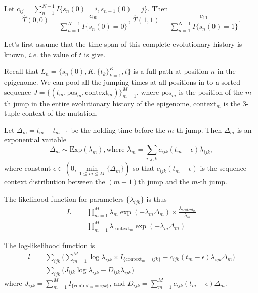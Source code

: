 \documentclass[11pt]{article}
\begin{document}
Let $c_{ij} = \sum_{n=1}^{N-1}I\{s_n(0) =i, s_{n+1}(0)=j\}$. Then 
\[ \hat{T}(0, 0) = \frac{c_{00}}{\sum_{n=1}^{N-1}I\{s_n(0) = 0\}}, ~ 
\hat{T}(1,1) = \frac{c_{11}}{\sum_{n=1}^{N-1}I\{s_n(0) = 1\}}.
\]

Let's first assume that the time span of this complete evolutionary
history is known, \textit{i.e.} the value of $t$ is give.

Recall that $L_n = \{s_n(0), K, \{t_k\}_{k=1}^K, t\}$ is a full path
at position $n$ in the epigenome. We can pool all the jumping times at
all positions in to a sorted sequence $J = \{(t_m, \text{pos}_m,
\text{context}_m) \}_{m=1}^{M}$, where $\text{pos}_m$ is the position of the
$m$-th jump in the entire evolutionary history of the epigenome,
$\text{context}_m$ is the 3-tuple context of the mutation.

Let $\Delta_m = t_m - t_{m-1}$ be the holding time before the $m$-th
jump. Then $\Delta_m$ is an exponential variable 
\[
\Delta_m \sim \text{Exp}(\lambda_m), \text{where } \lambda_m = \sum\limits_{i,j,k}c_{ijk}(t_m - \epsilon)\lambda_{ijk},
\]
where constant 
$\epsilon \in (0, \min\limits_{1\le m \le M}\{\Delta_{m}\})$ so that 
$c_{ijk}(t_m - \epsilon)$ is the sequence
context distribution between the $(m-1)$th jump and the $m$-th jump.

The likelihood function for parameters $\{\lambda_{ijk}\}$ is thus
\begin{equation}\label{eqn:lik}
\begin{aligned}
L &= \prod\limits_{m=1}^{M} \lambda_m \exp(-\lambda_m\Delta_m) \times \frac{\lambda_{\text{context}_m}}{\lambda_m} \\
&=\prod\limits_{m=1}^{M}\lambda_{\text{context}_m}\exp(-\lambda_m\Delta_m)
\end{aligned}
\end{equation}

The log-likelihood function is 
\begin{equation}\label{eqn:loglik1}
\begin{aligned}
l & = \sum\limits_{ijk} \big( 
\sum_{m=1}^M{\log\lambda_{ijk}\times I_{\{ \text{context}_m = ijk\}} - c_{ijk}(t_m-\epsilon)\lambda_{ijk}\Delta_m } \big) \\
& = \sum\limits_{ijk} \big(J_{ijk}\log\lambda_{ijk} - D_{ijk}\lambda_{ijk} \big)
\end{aligned}
\end{equation}
where $J_{ijk} = \sum_{m=1}^M I_{\{\text{context}_m = ijk\}}$, and $D_{ijk} = \sum_{m=1}^Mc_{ijk}(t_m-\epsilon)\Delta_m$.
\end{document}
